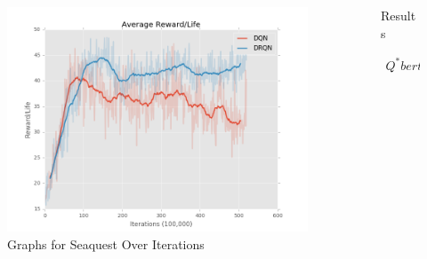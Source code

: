 \documentclass[final]{beamer}
\newlength{\sepwid}
\newlength{\onecolwid}
\newlength{\twocolwid}
\begin{document}
\begin{frame}[t]
\begin{columns}[t]
\begin{column}{\twocolwid}
\begin{columns}[t,totalwidth=\twocolwid]
\begin{column}{\onecolwid}
\begin{figure}[h]
\begin{minipage}{1.0\textwidth}
        \centering
        \includegraphics[scale=0.45]{Seaquest-DQN_vs_DRQN3.png}
    \end{minipage}
    \caption{Graphs for Seaquest Over Iterations}
\end{figure}


\end{column} %

\end{columns} %


\end{column} %

\begin{column}{\sepwid}\end{column} %

\begin{column}{\onecolwid} %


\begin{block}{Results}

\begin{gather*}
	Q^{\ast}bert Scores
\end{gather*}


\end{block}
\end{column}
\end{columns}
\end{frame}
\end{document}
